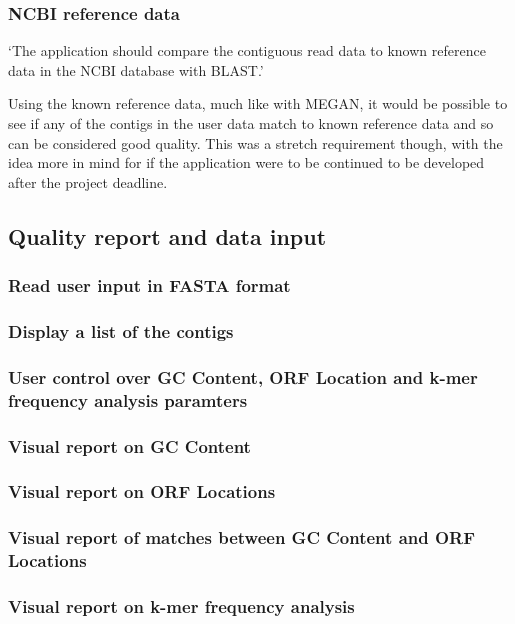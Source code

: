 \subsubsection{NCBI reference data}
`The application should compare the contiguous read data to known reference data in the NCBI database with BLAST.'

Using the known reference data, much like with MEGAN, it would be possible to see if any of the contigs in the user data match to known reference data and so can be considered good quality. This was a stretch requirement though, with the idea more in mind for if the application were to be continued to be developed after the project deadline.

\subsection{Quality report and data input}

\subsubsection{Read user input in FASTA format}

\subsubsection{Display a list of the contigs}

\subsubsection{User control over GC Content, ORF Location and k-mer frequency analysis paramters}

\subsubsection{Visual report on GC Content}

\subsubsection{Visual report on ORF Locations}

\subsubsection{Visual report of matches between GC Content and ORF Locations}

\subsubsection{Visual report on k-mer frequency analysis}


